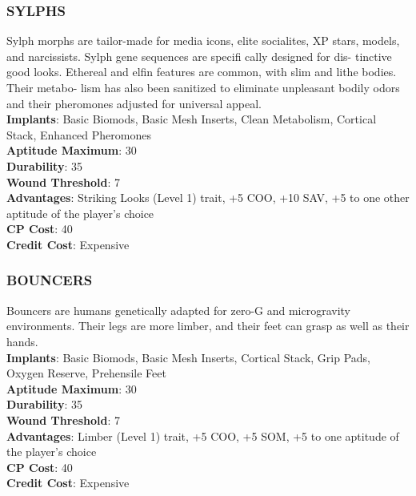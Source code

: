 \subsubsection{SYLPHS}
Sylph morphs are tailor-made for media icons, elite
socialites, XP stars, models, and narcissists. Sylph
gene sequences are specifi cally designed for dis-
tinctive good looks. Ethereal and elfin features are
common, with slim and lithe bodies. Their metabo-
lism has also been sanitized to eliminate unpleasant
bodily odors and their pheromones adjusted for
universal appeal.
\\ \textbf{Implants}: Basic Biomods, Basic Mesh Inserts, Clean
Metabolism, Cortical Stack, Enhanced Pheromones
\\ \textbf{Aptitude Maximum}: 30
\\ \textbf{Durability}: 35
\\ \textbf{Wound Threshold}: 7
\\ \textbf{Advantages}: Striking Looks (Level 1) trait, +5 COO,
+10 SAV, +5 to one other aptitude of the player’s
choice
\\ \textbf{CP Cost}: 40
\\ \textbf{Credit Cost}: Expensive

\subsubsection{BOUNCERS}
Bouncers are humans genetically adapted for zero-G
and microgravity environments. Their legs are more
limber, and their feet can grasp as well as their hands.
\\ \textbf{Implants}: Basic Biomods, Basic Mesh Inserts, Cortical
Stack, Grip Pads, Oxygen Reserve, Prehensile Feet
\\ \textbf{Aptitude Maximum}: 30
\\ \textbf{Durability}: 35
\\ \textbf{Wound Threshold}: 7
\\ \textbf{Advantages}: Limber (Level 1) trait, +5 COO, +5 SOM,
+5 to one aptitude of the player’s choice
\\ \textbf{CP Cost}: 40
\\ \textbf{Credit Cost}: Expensive
